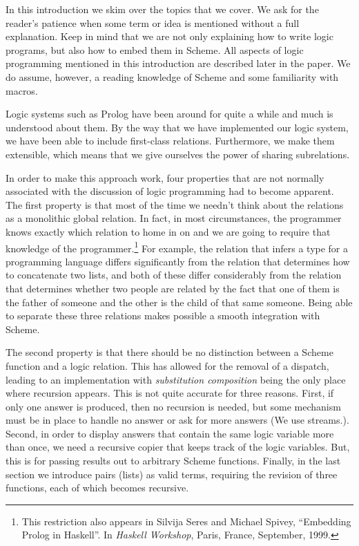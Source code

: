 In this introduction we skim over the topics that we cover.  We ask
for the reader's patience when some term or idea is mentioned without
a full explanation.  Keep in mind that we are not only explaining how
to write logic programs, but also how to embed them in Scheme.  All
aspects of logic programming mentioned in this introduction are
described later in the paper.  We do assume, however, a reading
knowledge of Scheme and some familiarity with macros.

Logic systems such as Prolog have been around for quite a while and much is
understood about them.  By the way that we have implemented our logic
system, we have been able to include first-class relations.  Furthermore,
we make them extensible, which means that we give ourselves the power
of sharing subrelations.

In order to make this approach work, four properties that are not
normally associated with the discussion of logic programming had to
become apparent.  The first property is that most of the time we
needn't think about the relations as a monolithic global relation.  In
fact, in most circumstances, the programmer knows exactly which
relation to home in on and we are going to require that knowledge of
the programmer.\footnote{This restriction also appears in Silvija
Seres and Michael Spivey, ``Embedding Prolog in Haskell''. In
\emph{Haskell Workshop}, Paris, France, September, 1999.}  For
example, the relation that infers a type for a programming language
differs significantly from the relation that determines how to
concatenate two lists, and both of these differ considerably from the
relation that determines whether two people are related by the fact
that one of them is the father of someone and the other is the child
of that same someone.  Being able to separate these three relations
makes possible a smooth integration with Scheme.

The second property is that there should be no distinction between a
Scheme function and a logic relation.  This has allowed for the
removal of a dispatch, leading to an implementation with
\emph{substitution composition} being the only place where recursion
appears.  This is not quite accurate for three reasons.  First, if
only one answer is produced, then no recursion is needed, but some
mechanism must be in place to handle no answer or ask for more answers
(We use streams.).  Second, in order to display answers that contain
the same logic variable more than once, we need a recursive copier
that keeps track of the logic variables.  But, this is for passing
results out to arbitrary Scheme functions.  Finally, in the last
section we introduce pairs (lists) as valid terms, requiring the
revision of three functions, each of which becomes recursive.

